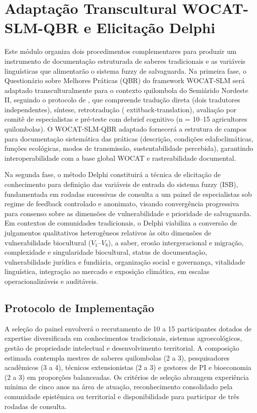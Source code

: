 \section{Adaptação Transcultural WOCAT-SLM-QBR e Elicitação Delphi}

Este módulo organiza dois procedimentos complementares para produzir um instrumento de documentação estruturada de saberes tradicionais e as variáveis linguísticas que alimentarão o sistema fuzzy de salvaguarda. Na primeira fase, o Questionário sobre Melhores Práticas (QBR) do framework WOCAT-SLM \cite{WOCAT2023,Schwilch2011} será adaptado transculturalmente para o contexto quilombola do Semiárido Nordeste II, seguindo o protocolo de , que compreende tradução direta (dois tradutores independentes), síntese, retrotradução (	extit{back-translation}), avaliação por comitê de especialistas e pré-teste com debrief cognitivo (n = 10--15 agricultores quilombolas). O WOCAT-SLM-QBR adaptado fornecerá a estrutura de campos para documentação sistemática das práticas (descrição, condições edafoclimáticas, funções ecológicas, modos de transmissão, sustentabilidade percebida), garantindo interoperabilidade com a base global WOCAT e rastreabilidade documental.

Na segunda fase, o método Delphi \cite{Linstone1975,Rowe1999} constituirá a técnica de elicitação de conhecimento para definição das variáveis de entrada do sistema fuzzy (ISB), fundamentada em rodadas sucessivas de consulta a um painel de especialistas sob regime de feedback controlado e anonimato, visando convergência progressiva para consenso sobre as dimensões de vulnerabilidade e prioridade de salvaguarda. Em contextos de comunidades tradicionais, o Delphi viabiliza a conversão de julgamentos qualitativos heterogêneos relativos às oito dimensões de vulnerabilidade biocultural ($V_1$--$V_8$), a saber, erosão intergeracional e migração, complexidade e singularidade biocultural, status de documentação, vulnerabilidade jurídica e fundiária, organização social e governança, vitalidade linguística, integração ao mercado e exposição climática, em escalas operacionalizáveis e auditáveis.

\subsection{Protocolo de Implementação}

A seleção do painel envolverá o recrutamento de 10 a 15 participantes dotados de expertise diversificada em conhecimentos tradicionais, sistemas agroecológicos, gestão de propriedade intelectual e desenvolvimento territorial. A composição estimada contempla mestres de saberes quilombolas (2 a 3), pesquisadores acadêmicos (3 a 4), técnicos extensionistas (2 a 3) e gestores de PI e bioeconomia (2 a 3) em proporções balanceadas. Os critérios de seleção abrangem experiência mínima de cinco anos na área de atuação, reconhecimento consolidado pela comunidade epistêmica ou territorial e disponibilidade para participar de três rodadas de consulta.

